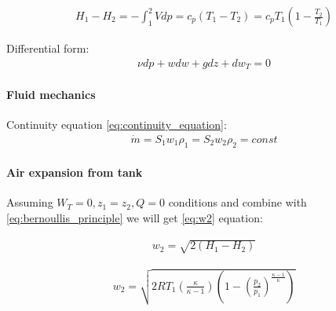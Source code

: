 \documentclass[class=article, crop=false]{standalone}
\begin{document}
\begin{align}
    H_1- H_2 = -\int_1^2 V dp = c_p(T_1-T_2) = c_p T_1(1-\frac{T_2}{T_1})
    \label{eq:etalpi_sub}
\end{align}

Differential form:
\begin{align}
    \nu dp + w dw + g dz + dw_T = 0
\end{align}


\paragraph{Fluid mechanics}
%

Continuity equation \ref{eq:continuity_equation}: 
\begin{align}
    \dot{m} = S_1 w_1 \rho_1 = S_2 w_2 \rho_2 = const
    \label{eq:continuity_equation}
\end{align}

\paragraph{Air expansion from tank}
Assuming $W_T = 0, z_1 = z_2, Q = 0$ conditions and combine with
\ref{eq:bernoullis_principle} we will get \ref{eq:w2} equation:

\begin{align}
    w_2 = \sqrt{2(H_1 - H_2)}
    \label{eq:w2}
\end{align}

\begin{align}
    w_2 =
    \sqrt{2RT_1(\frac{\kappa}{\kappa-1})(1-(\frac{p_2}{p_1})^\frac{\kappa-1}{\kappa})}
    \label{eq:w2_final}
\end{align}
\end{document}
